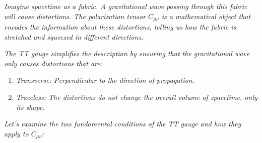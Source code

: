 \documentclass{article}
\begin{document}
\emph{Imagine spacetime as a fabric. A gravitational wave passing through this fabric will cause distortions. The polarization tensor $C_{\mu\nu}$ is a mathematical object that encodes the information about these distortions, telling us how the fabric is stretched and squeezed in different directions.}

\emph{The TT gauge simplifies the description by ensuring that the gravitational wave only causes distortions that are:}
\begin{enumerate}
    \item \emph{Transverse: Perpendicular to the direction of propagation.}
    \item \emph{Traceless: The distortions do not change the overall volume of spacetime, only its shape.}
\end{enumerate}

\emph{Let's examine the two fundamental conditions of the TT gauge and how they apply to $C_{\mu\nu}$:}
\end{document}

